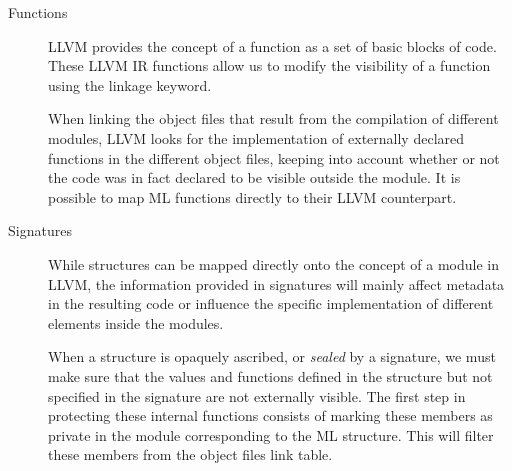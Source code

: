 \begin{description}




\item[Functions]
LLVM provides the concept of a function as a set of basic blocks of code. 
These LLVM IR functions allow us to modify the visibility of a function using the linkage keyword. 

When linking the object files that result from the compilation of different modules, LLVM looks for the implementation of externally declared functions in the different object files, keeping into account whether or not the code was in fact declared to be visible outside the module. It is possible to map ML functions directly to their LLVM counterpart.

\item[Signatures]
While structures can be mapped directly onto the concept of a module in LLVM, the information provided in signatures will mainly affect metadata in the resulting code or influence the specific implementation of different elements inside the modules.

When a structure is opaquely ascribed, or \emph{sealed} by a signature, we must make sure that the values and functions defined in the structure but not specified in the signature are not externally visible. The first step in protecting these internal functions consists of marking these members as private in the module corresponding to the ML structure. This will filter these members from the object files link table. %


\end{description}
